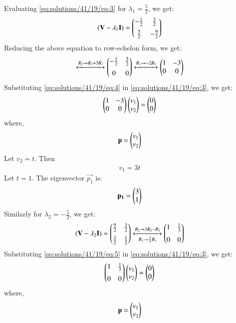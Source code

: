 Evaluating \eqref{eq:solutions/41/19/eq:3} for $\lambda_1 = \frac{5}{2}$, we get:
\begin{align}
  (\mathbf{V} - \lambda_1 \mathbf{I})  = \begin{pmatrix}-\frac{1}{2} & \frac{3}{2} \\[0.2cm]\frac{3}{2} & -\frac{9}{2}\end{pmatrix}
\end{align}
Reducing the above equation to row-echelon form, we get:
\begin{align}
  \xleftrightarrow[]{R_2 \rightarrow R_2 + 3R_1} \begin{pmatrix}-\frac{1}{2} & \frac{3}{2} \\[0.2cm]0 & 0\end{pmatrix} \xleftrightarrow[]{R_1 \rightarrow -2R_1} \begin{pmatrix}1 & -3 \\ 0 & 0\end{pmatrix} \label{eq:solutions/41/19/eq:4}
\end{align}
Substituting \eqref{eq:solutions/41/19/eq:4} in \eqref{eq:solutions/41/19/eq:3}, we get:
\begin{align}
  \begin{pmatrix}1 & -3 \\ 0 & 0\end{pmatrix} \begin{pmatrix}v_1 \\ v_2\end{pmatrix} = \begin{pmatrix}0 \\ 0\end{pmatrix}
\end{align}
where,
\begin{align}
  \mathbf{p} = \begin{pmatrix}v_1 \\ v_2\end{pmatrix}
\end{align}
Let $v_2 = t$. Then
\begin{align}
  v_1 = 3t
\end{align}
Let $t = 1$. The eigenvector $\vec{p_1}$ is:
\begin{align}
  \mathbf{p_1} = \begin{pmatrix}3 \\ 1\end{pmatrix}
\end{align}
Similarly for $\lambda_2 = -\frac{5}{2}$, we get:
\begin{align}
    (\mathbf{V} - \lambda_2 \mathbf{I})  = \begin{pmatrix}\frac{9}{2} & \frac{3}{2} \\[0.2cm]\frac{3}{2} & \frac{1}{2}\end{pmatrix} \xleftrightarrow[R_1 \rightarrow \frac{2}{9}R_1]{R_2 \rightarrow 3R_2 - R_1} \begin{pmatrix}1 & \frac{1}{3} \\[0.2cm]0 & 0\end{pmatrix} \label{eq:solutions/41/19/eq:5}
\end{align}
Substituting \eqref{eq:solutions/41/19/eq:5} in \eqref{eq:solutions/41/19/eq:3}, we get:
\begin{align}
  \begin{pmatrix}1 & \frac{1}{3} \\[0.2cm]0 & 0\end{pmatrix} \begin{pmatrix}v_1 \\ v_2\end{pmatrix} = \begin{pmatrix}0 \\ 0\end{pmatrix}
\end{align}
where,
\begin{align}
  \mathbf{p} = \begin{pmatrix}v_1 \\ v_2\end{pmatrix}
\end{align}
